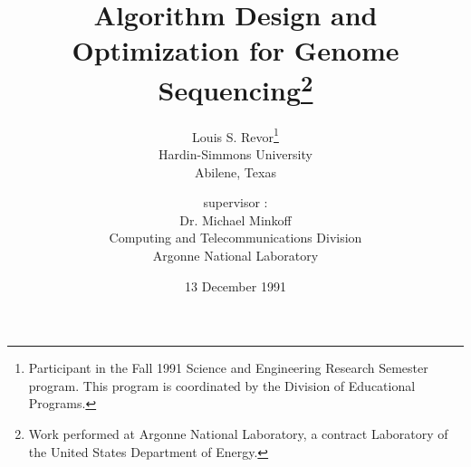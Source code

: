 \def\alxmp{CRAY~X-MP/14}
\def\xmp{CRAY~X-MP}
\def\gamma{Intel~iPSC/860}
\def\achilles{Sun4/490}
\def\ariel{Sun4c}
\def\hp{HP~720}
\def\delta{Intel Touchstone Delta}
\def\intel{Intel~310}

\title{Algorithm Design and Optimization for Genome Sequencing\thanks{Work
performed at Argonne National Laboratory, a contract Laboratory of the
United States Department of Energy.}}
\author{Louis S. Revor\thanks{
     Participant in the Fall 1991 Science and Engineering
     Research Semester program.
     This program is coordinated by the Division
     of Educational Programs.}\\
     Hardin-Simmons University\\
     Abilene, Texas\\
   \and
     supervisor :\\
     Dr. Michael Minkoff\\
     Computing and Telecommunications Division\\
     Argonne National Laboratory}
\date{13 December 1991}
\maketitle
\newpage






